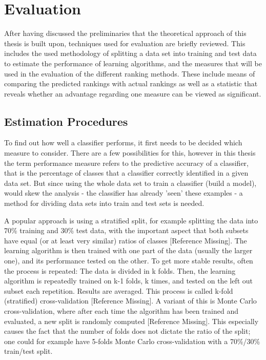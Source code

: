 \section{Evaluation}

After having discussed the preliminaries that the theoretical approach of this thesis is built upon, techniques used for evaluation are briefly reviewed. This includes the used methodology of splitting a data set into training and test data to estimate the performance of learning algorithms, and the measures that will be used in the evaluation of the different ranking methods. These include means of comparing the predicted rankings with actual rankings as well as a statistic that reveals whether an advantage regarding one measure can be viewed as significant.

\subsection{Estimation Procedures}

To find out how well a classifier performs, it first needs to be decided which measure to consider. There are a few possibilities for this, however in this thesis the term performance measure refers to the predictive accuracy of a classifier, that is the percentage of classes that a classifier correctly identified in a given data set. But since using the whole data set to train a classifier (build a model), would skew the analysis - the classifier has already 'seen' these examples - a method for dividing data sets into train and test sets is needed. 

A popular approach is using a stratified split, for example splitting the data into 70\% training and 30\% test data, with the important aspect that both subsets have equal (or at least very similar) ratios of classes [Reference Missing]. The learning algorithm is then trained with one part of the data (usually the larger one), and its performance tested on the other. To get more stable results, often the process is repeated: The data is divided in k folds. Then, the learning algorithm is repeatedly trained on k-1 folds, k times, and tested on the left out subset each repetition. Results are averaged. This process is called k-fold (stratified) cross-validation [Reference Missing]. A variant of this is Monte Carlo cross-validation, where after each time the algorithm has been trained and evaluated, a new split is randomly computed [Reference Missing]. This especially causes the fact that the number of folds does not dictate the ratio of the split; one could for example have 5-folds Monte Carlo cross-validation with a 70\%/30\% train/test split.

